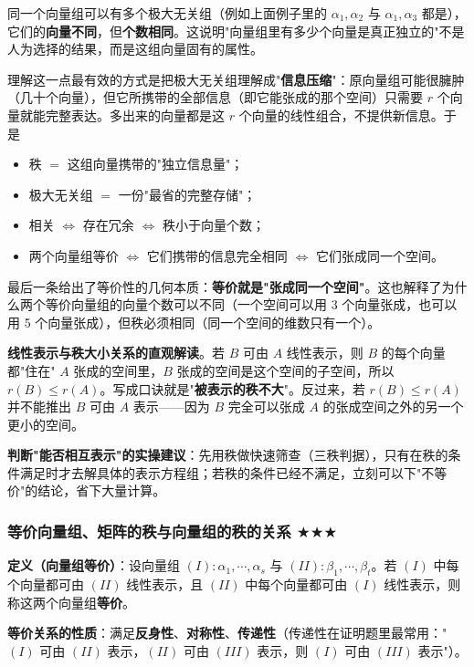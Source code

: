 \documentclass[11pt,openany,UTF8]{ctexbook}
\begin{document}
同一个向量组可以有多个极大无关组（例如上面例子里的 $\alpha_1,\alpha_2$ 与 $\alpha_1,\alpha_3$ 都是），它们的\textbf{向量不同}，但\textbf{个数相同}。这说明"向量组里有多少个向量是真正独立的"不是人为选择的结果，而是这组向量固有的属性。

理解这一点最有效的方式是把极大无关组理解成"\textbf{信息压缩}"：原向量组可能很臃肿（几十个向量），但它所携带的全部信息（即它能张成的那个空间）只需要 $r$ 个向量就能完整表达。多出来的向量都是这 $r$ 个向量的线性组合，不提供新信息。于是

\begin{itemize}
\item 秩 $=$ 这组向量携带的"独立信息量"；
\item 极大无关组 $=$ 一份"最省的完整存储"；
\item 相关 $\iff$ 存在冗余 $\iff$ 秩小于向量个数；
\item 两个向量组等价 $\iff$ 它们携带的信息完全相同 $\iff$ 它们张成同一个空间。
\end{itemize}
最后一条给出了等价性的几何本质：\textbf{等价就是"张成同一个空间"}。这也解释了为什么两个等价向量组的向量个数可以不同（一个空间可以用 3 个向量张成，也可以用 5 个向量张成），但秩必须相同（同一个空间的维数只有一个）。

\textbf{线性表示与秩大小关系的直观解读}。若 $B$ 可由 $A$ 线性表示，则 $B$ 的每个向量都"住在" $A$ 张成的空间里，$B$ 张成的空间是这个空间的子空间，所以 $r(B)\le r(A)$。写成口诀就是"\textbf{被表示的秩不大}"。反过来，若 $r(B)\le r(A)$ 并不能推出 $B$ 可由 $A$ 表示——因为 $B$ 完全可以张成 $A$ 的张成空间之外的另一个更小的空间。

\textbf{判断"能否相互表示"的实操建议}：先用秩做快速筛查（三秩判据），只有在秩的条件满足时才去解具体的表示方程组；若秩的条件已经不满足，立刻可以下"不等价"的结论，省下大量计算。

\subsubsection{等价向量组、矩阵的秩与向量组的秩的关系 $\bigstar$$\bigstar$$\bigstar$}

\textbf{定义（向量组等价）}：设向量组 $(I):\alpha_1,\cdots,\alpha_s$ 与 $(II):\beta_1,\cdots,\beta_t$。若 $(I)$ 中每个向量都可由 $(II)$ 线性表示，且 $(II)$ 中每个向量都可由 $(I)$ 线性表示，则称这两个向量组\textbf{等价}。

\textbf{等价关系的性质}：满足\textbf{反身性}、\textbf{对称性}、\textbf{传递性}（传递性在证明题里最常用："$(I)$ 可由 $(II)$ 表示，$(II)$ 可由 $(III)$ 表示，则 $(I)$ 可由 $(III)$ 表示"）。
\end{document}
